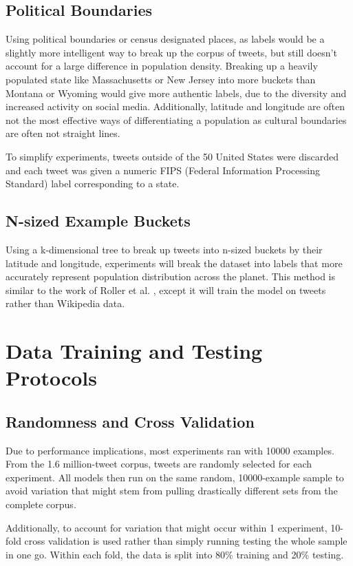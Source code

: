 \documentclass[midd]{thesis}
\begin{document}
\subsection{Political Boundaries}
Using political boundaries or census designated places, as labels would be a slightly more intelligent way to break up the corpus of tweets, but still doesn't account for a large difference in population density. Breaking up a heavily populated state like Massachusetts or New Jersey into more buckets than Montana or Wyoming would give more authentic labels, due to the diversity and increased activity on social media. Additionally, latitude and longitude are often not the most effective ways of differentiating a population as cultural boundaries are often not straight lines.

To simplify experiments, tweets outside of the 50 United States were discarded and each tweet was given a numeric FIPS (Federal Information Processing Standard) label corresponding to a state.

\subsection{N-sized Example Buckets}
Using a k-dimensional tree to break up tweets into n-sized buckets by their latitude and longitude, experiments will break the dataset into labels that more accurately represent population distribution across the planet. This method is similar to the work of Roller et al. \cite{roller2012supervised}, except it will train the model on tweets rather than Wikipedia data.

\section{Data Training and Testing Protocols}

\subsection{Randomness and Cross Validation}
Due to performance implications, most experiments ran with 10000 examples. From the 1.6 million-tweet corpus, tweets are randomly selected for each experiment. All models then run on the same random, 10000-example sample to avoid variation that might stem from pulling drastically different sets from the complete corpus.

Additionally, to account for variation that might occur within 1 experiment, 10-fold cross validation is used rather than simply running testing the whole sample in one go. Within each fold, the data is split into 80\% training and 20\% testing.
\end{document}
